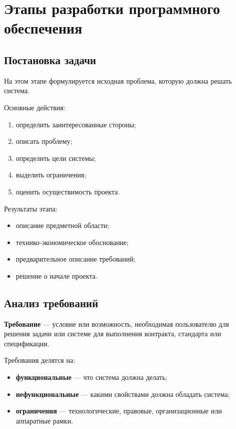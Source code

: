 \documentclass[12pt,a4paper]{article}
\begin{document}
\section{Этапы разработки программного обеспечения}

\subsection{Постановка задачи}

На этом этапе формулируется исходная проблема, которую должна решать система.

Основные действия:
\begin{enumerate}
    \item определить заинтересованные стороны;
    \item описать проблему;
    \item определить цели системы;
    \item выделить ограничения;
    \item оценить осуществимость проекта.
\end{enumerate}

Результаты этапа:
\begin{itemize}
    \item описание предметной области;
    \item технико-экономическое обоснование;
    \item предварительное описание требований;
    \item решение о начале проекта.
\end{itemize}

\subsection{Анализ требований}

\textbf{Требование} --- условие или возможность, необходимая пользователю для решения задачи или системе для выполнения контракта, стандарта или спецификации.

Требования делятся на:
\begin{itemize}
    \item \textbf{функциональные} --- что система должна делать;
    \item \textbf{нефункциональные} --- какими свойствами должна обладать система;
    \item \textbf{ограничения} --- технологические, правовые, организационные или аппаратные рамки.
\end{itemize}
\end{document}
